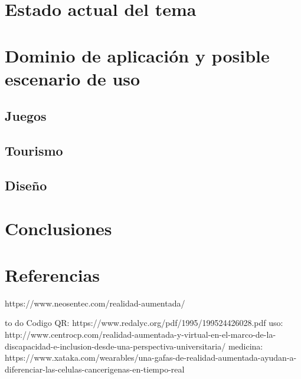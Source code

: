 \documentclass[a4paper,11pt]{scrartcl}
\begin{document}
\section{Estado actual del tema}

\section{Dominio de aplicación y posible escenario de uso}

\subsection{Juegos}
\subsection{Tourismo}
\subsection{Diseño}

\section{Conclusiones}

\section{Referencias}
%
%
https://www.neosentec.com/realidad-aumentada/

to do
Codigo QR:
https://www.redalyc.org/pdf/1995/199524426028.pdf
uso:
http://www.centrocp.com/realidad-aumentada-y-virtual-en-el-marco-de-la-discapacidad-e-inclusion-desde-una-perspectiva-universitaria/
medicina:
https://www.xataka.com/wearables/una-gafas-de-realidad-aumentada-ayudan-a-diferenciar-las-celulas-cancerigenas-en-tiempo-real
\end{document}
